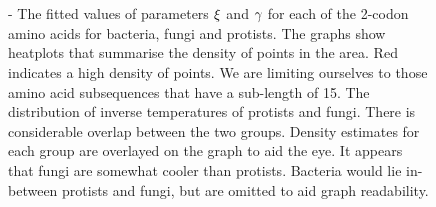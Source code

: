 \documentclass[a4paper,10pt]{paper}%
\begin{document}
%
%
\begin{figure}
\centering
{}
\\
\\
\caption{ \protect{}-\protect{} The fitted values of  parameters $\protect\xi$ and $\protect\gamma$  for each of the 2-codon amino acids for bacteria, fungi and protists. The graphs show heatplots that summarise the density of points in the area. Red indicates a high  density of points. We are  limiting ourselves to those amino acid subsequences that have a sub-length of 15. \protect{} The distribution of  inverse temperatures of protists and fungi. There is considerable overlap between the two groups. Density estimates for each group are overlayed on the graph to aid the eye. It appears that fungi are somewhat cooler than protists. Bacteria would lie in-between protists and fungi, but are omitted to aid graph readability.}
\label{fourspecies}
\label{fitresults}
\end{figure}
%
%
%




%
%
\end{document}
